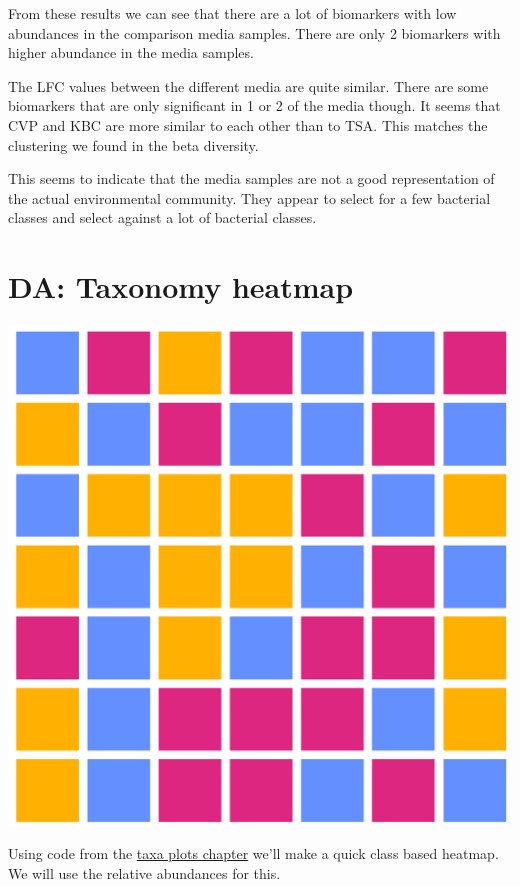 \documentclass[
]{book}
\begin{document}
From these results we can see that there are a lot of biomarkers with low abundances in the comparison media samples.
There are only 2 biomarkers with higher abundance in the media samples.

The LFC values between the different media are quite similar.
There are some biomarkers that are only significant in 1 or 2 of the media though.
It seems that CVP and KBC are more similar to each other than to TSA.
This matches the clustering we found in the beta diversity.

This seems to indicate that the media samples are not a good representation of the actual environmental community.
They appear to select for a few bacterial classes and select against a lot of bacterial classes.

\hypertarget{da-taxonomy-heatmap}{%
\section{DA: Taxonomy heatmap}\label{da-taxonomy-heatmap}}

\includegraphics{figures/heatmap_2.png}

Using code from the \protect\hyperlink{chaptaxaplots}{taxa plots chapter} we'll make a quick class based heatmap.
We will use the relative abundances for this.
\end{document}
